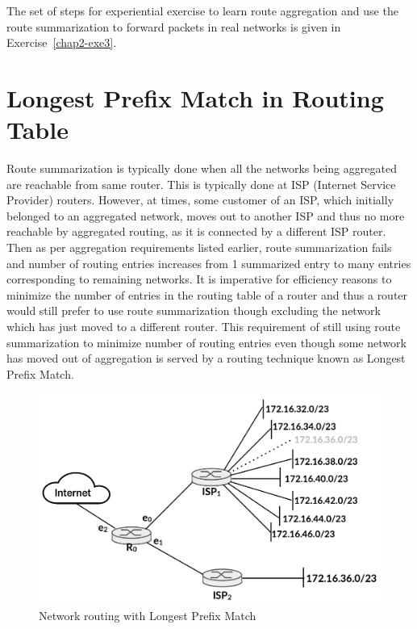 \begin{multicols}{2}
The set of steps for experiential exercise to learn route aggregation and use the route summarization to forward packets in real networks is given in Exercise~\ref{chap2-exe3}.

\section{Longest Prefix Match in Routing Table}\label{chap2-sec6}

Route summarization is typically done when all the networks being aggregated are reachable from same router. This is typically done at ISP (Internet Service Provider) routers. However, at times, some customer of an ISP, which initially belonged to an aggregated network, moves out to another ISP and thus no more reachable by aggregated routing, as it is connected by a different ISP router. Then as per aggregation requirements listed earlier, route summarization fails and number of routing entries increases from 1 summarized entry to many entries corresponding to remaining networks. It is imperative for efficiency reasons to minimize the number of entries in the routing table of a router and thus a router would still prefer to use route summarization though excluding the network which has just moved to a different router. This requirement of still using route summarization to minimize number of routing entries even though some network has moved out of aggregation is served by a routing technique known as Longest Prefix Match.

\begin{figure}[H]
\centering
\includegraphics[scale=.8]{src/Figures/chap2/chap2-fig03.jpg}
\caption{Network routing with Longest Prefix Match}\label{chap2-fig03}
\end{figure}
\end{multicols}

